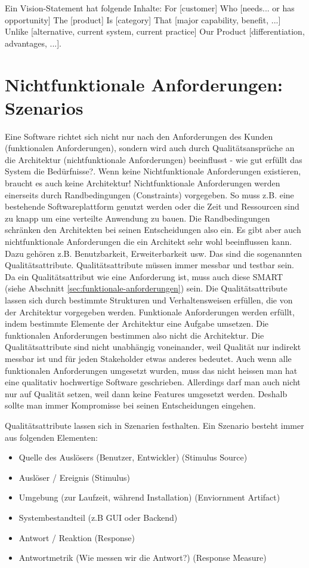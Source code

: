 Ein Vision-Statement hat folgende Inhalte: For [customer] Who [needs... or has opportunity] The [product] Is [category] That [major capability, benefit, ...] Unlike [alternative, current system, current practice] Our Product [differentiation, advantages, ...].

\section{Nichtfunktionale Anforderungen: Szenarios}

Eine Software richtet sich nicht nur nach den Anforderungen des Kunden (funktionalen Anforderungen), sondern wird auch durch Qualitätsansprüche an die Architektur (nichtfunktionale Anforderungen) beeinflusst - wie gut erfüllt das System die Bedürfnisse?. Wenn keine Nichtfunktionale Anforderungen existieren, braucht es auch keine Architektur! Nichtfunktionale Anforderungen werden einerseits durch Randbedingungen (Constraints) vorgegeben. So muss z.B. eine bestehende Softwareplattform genutzt werden oder die Zeit und Ressourcen sind zu knapp um eine verteilte Anwendung zu bauen. Die Randbedingungen schränken den Architekten bei seinen Entscheidungen also ein. 
Es gibt aber auch nichtfunktionale Anforderungen die ein Architekt sehr wohl beeinflussen kann. Dazu gehören z.B. Benutzbarkeit, Erweiterbarkeit usw. Das sind die sogenannten Qualitätsattribute. Qualitätsattribute müssen immer messbar und testbar sein. Da ein Qualitätsattribut wie eine Anforderung ist, muss auch diese SMART (siehe Abschnitt \ref{sec:funktionale-anforderungen}) sein. Die Qualitätsattribute lassen sich durch bestimmte Strukturen und Verhaltensweisen erfüllen, die von der Architektur vorgegeben werden. Funktionale Anforderungen werden erfüllt, indem bestimmte Elemente der Architektur eine Aufgabe umsetzen. Die funktionalen Anforderungen bestimmen also nicht die Architektur. 
Die Qualitätsattribute sind nicht unabhängig voneinander, weil Qualität nur indirekt messbar ist und für jeden Stakeholder etwas anderes bedeutet. Auch wenn alle funktionalen Anforderungen umgesetzt wurden, muss das nicht heissen man hat eine qualitativ hochwertige Software geschrieben. Allerdings darf man auch nicht nur auf Qualität setzen, weil dann keine Features umgesetzt werden. Deshalb sollte man immer Kompromisse bei seinen Entscheidungen eingehen.

Qualitätsattribute lassen sich in Szenarien festhalten. Ein Szenario besteht immer aus folgenden Elementen:
\begin{itemize}
	\item Quelle des Auslösers (Benutzer, Entwickler) (Stimulus Source)
	\item Auslöser / Ereignis (Stimulus)
	\item Umgebung (zur Laufzeit, während Installation) (Enviornment Artifact)
	\item Systembestandteil (z.B GUI oder Backend)
	\item Antwort / Reaktion (Response)
	\item Antwortmetrik (Wie messen wir die Antwort?) (Response Measure)
\end{itemize}

